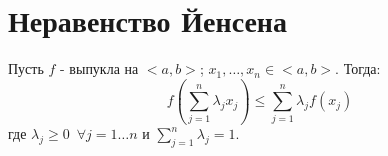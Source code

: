 \documentclass[11pt, a4paper]{article}
\def\sp{\, \, \,}
\def\ds{\displaystyle}
\begin{document}
    \section{Неравенство Йенсена}
    Пусть $f$ - выпукла на $<a,b>$; $x_1, \ldots , x_n \in <a,b>$. Тогда:
    $$f\left(\sum_{j=1}^n \lambda_j x_j\right) \leq \sum_{j=1}^n \lambda_j f(x_j)$$
    где $\lambda_j \geq 0 \sp \forall j = 1\ldots n$ и $\ds \sum_{j = 1}^n \lambda_j = 1$.
\end{document}
